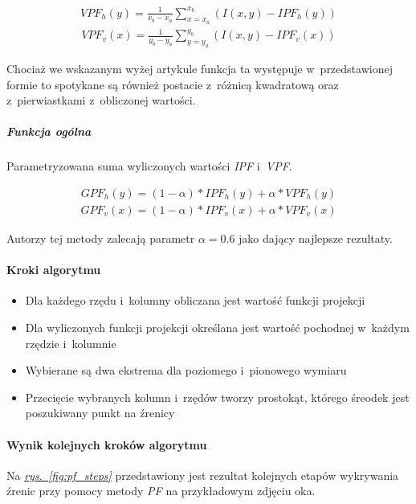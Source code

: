 \begin{align}
    {VPF_h}(y)=\frac{1}{{x_b}-{x_a}}\sum_{x={x_a}}^{{x_b}} (I(x,y) - {IPF_h(y)})
\end{align}
\begin{align}
    {VPF_v}(x)=\frac{1}{{y_b}-{y_a}}\sum_{y={y_a}}^{{y_b}} (I(x,y) - {IPF_v(x)})
\end{align}

Chociaż we wskazanym wyżej artykule funkcja ta występuje w~przedstawionej formie to spotykane są również postacie z~różnicą kwadratową oraz z~pierwiastkami z~obliczonej wartości. 

\subparagraph{Funkcja ogólna} Parametryzowana suma wyliczonych wartości \textit{IPF} i~\textit{VPF}.

\begin{align}
    {GPF_h}(y)=(1-\alpha) * {IPF_h(y)} + \alpha * {VPF_h(y)}
\end{align}
\begin{align}
    {GPF_v}(x)=(1-\alpha) * {IPF_v(x)} + \alpha * {VPF_v(x)} 
\end{align}

Autorzy tej metody zalecają parametr $\alpha = 0.6$ jako dający najlepsze rezultaty.

\paragraph{Kroki algorytmu}

\begin{itemize}
    \item Dla każdego rzędu i~kolumny obliczana jest wartość funkcji projekcji
    \item Dla wyliczonych funkcji projekcji określana jest wartość pochodnej w~każdym rzędzie i~kolumnie
    \item Wybierane są dwa ekstrema dla poziomego i~pionowego wymiaru
    \item Przecięcie wybranych kolumn i~rzędów tworzy prostokąt, którego śreodek jest poszukiwany punkt na źrenicy 
\end{itemize}

\paragraph{Wynik kolejnych kroków algorytmu}
Na \hyperref[{fig:pf_steps}]{\textit{rys.~\ref{fig:pf_steps}}} przedstawiony jest rezultat kolejnych etapów wykrywania źrenic przy pomocy metody \textit{PF} na przykładowym zdjęciu oka.

